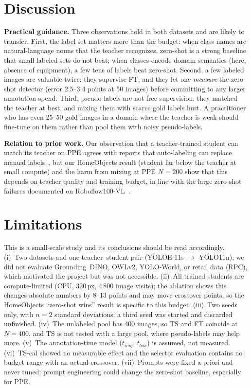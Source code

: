 \section{Discussion}
\textbf{Practical guidance.} Three observations hold in both datasets and are likely to transfer. First, the label set matters more than the budget: when class names are natural-language nouns that the teacher recognizes, zero-shot is a strong baseline that small labeled sets do not beat; when classes encode domain semantics (here, absence of equipment), a few tens of labels beat zero-shot. Second, a few labeled images are valuable twice: they supervise FT, and they let one \emph{measure} the zero-shot detector (error 2.5--3.4 points at 50 images) before committing to any larger annotation spend. Third, pseudo-labels are not free supervision: they matched the teacher at best, and mixing them with scarce gold labels hurt. A practitioner who has even 25--50 gold images in a domain where the teacher is weak should fine-tune on them rather than pool them with noisy pseudo-labels.

\textbf{Relation to prior work.} Our observation that a teacher-trained student can match its teacher on PPE agrees with reports that auto-labeling can replace manual labels~\cite{son2024teacherstudent,abid2025waste}, but our HomeObjects result (student far below the teacher at small compute) and the harm from mixing at PPE $N{=}200$ show that this depends on teacher quality and training budget, in line with the large zero-shot failures documented on Roboflow100-VL~\cite{robicheaux2025rf100vl}.

\section{Limitations}
This is a small-scale study and its conclusions should be read accordingly. (i)~Two datasets and one teacher--student pair (YOLOE-11s $\rightarrow$ YOLO11n); we did not evaluate Grounding~DINO, OWLv2, YOLO-World, or retail data (RPC), which motivated the project but was not accessible. (ii)~All trained students are compute-limited (CPU, 320\,px, 4\,800 image visits); the ablation shows this changes absolute numbers by 8--13 points and may move crossover points, so the HomeObjects ``zero-shot wins'' result is specific to this budget. (iii)~Two seeds only, with $n{=}2$ standard deviations; a third seed was started and discarded unfinished. (iv)~The unlabeled pool has 400 images, so TS and FT coincide at $N{=}400$, and TS is not tested with a large pool, where pseudo-labels may help more. (v)~The annotation-time model ($t_{img}$, $t_{box}$) is assumed, not measured. (vi)~TS-cal showed no measurable effect and the selector evaluation contains no budget range with an actual crossover. (vii)~Prompts were fixed a priori and never tuned; prompt engineering could change the zero-shot baseline, especially for PPE.

